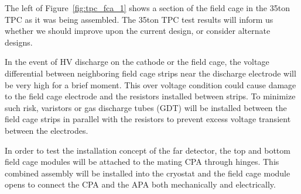 The left of Figure~\ref{fig:tpc_fca_1} shows a section of the field cage in the 35ton TPC as it was being assembled.  The 35ton TPC test results will inform us whether we should improve upon the current design, or consider alternate designs.

In the event of HV discharge on the cathode or the field cage, the voltage differential between neighboring field cage strips near the discharge electrode will be very high for a brief moment.  This over voltage condition could cause damage to the field cage electrode and the resistors installed between strips.  To minimize such risk, varistors or gas discharge tubes (GDT) will be installed between the field cage strips in parallel with the resistors to prevent excess voltage transient between the electrodes. 

In order to test the installation concept of the far detector, the top and bottom field cage modules will be attached to the mating CPA through hinges.  This combined assembly will be installed into the cryostat and the field cage module opens to connect the CPA and the APA both mechanically and electrically. 






